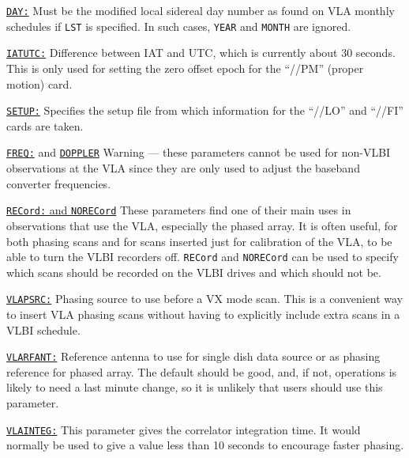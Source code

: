 \documentclass{report}
\begin{document}
\begin{list}{}{\parsep 0em  \itemsep 0em }
\item 
{\hyperref[MP:LST]{{\tt DAY:}}} Must be the modified local sidereal
day number as found on VLA monthly schedules if {\tt LST} is
specified. In such cases, {\tt YEAR} and {\tt MONTH} are ignored.

\item 
{\hyperref[MP:IATUTC]{{\tt IATUTC:}}} Difference between IAT and UTC,
which is currently about 30 seconds. This is only used for setting the
zero offset epoch for the ``//PM'' (proper motion) card.

\item 
{\hyperref[MP:SETUP]{{\tt SETUP:}}} Specifies the setup file from
which information for the ``//LO'' and ``//FI'' cards are taken.

\item 
{\hyperref[MP:FREQ]{{\tt FREQ:}}} and 
{\hyperref[MP:DOPPLER]{{\tt DOPPLER}}}
Warning --- these parameters cannot be used for non-VLBI observations
at the VLA since they are only used to adjust the baseband converter
frequencies.

\item 
{\hyperref[MP:RECORD]{{\tt RECord:} and {\tt NORECord}}} These parameters
find one of their main uses in observations that use the VLA, especially
the phased array.  It is often useful, for both phasing scans and for
scans inserted just for calibration of the VLA, to be able to turn the
VLBI recorders off.  {\tt RECord} and {\tt NORECord} can be used
to specify which scans should be recorded on the VLBI drives and which
should not be.

\item 
{\hyperref[MP:VLAPSRC]{{\tt VLAPSRC:}}} Phasing source to use
before a VX mode scan.  This is a convenient way to insert VLA phasing
scans without having to explicitly include extra scans in a VLBI
schedule.

\item 
{\hyperref[MP:VLARFANT]{{\tt VLARFANT:}}} Reference antenna to use
for single dish data source or as phasing reference for phased array.
The default should be good, and, if not, operations is likely to need
a last minute change, so it is unlikely that users should use this
parameter.

\item 
{\hyperref[MP:VLAINTEG]{{\tt VLAINTEG:}}} This parameter gives the
correlator integration time.  It would normally be used to give a
value less than 10 seconds to encourage faster phasing.


\end{list}
\end{document}
